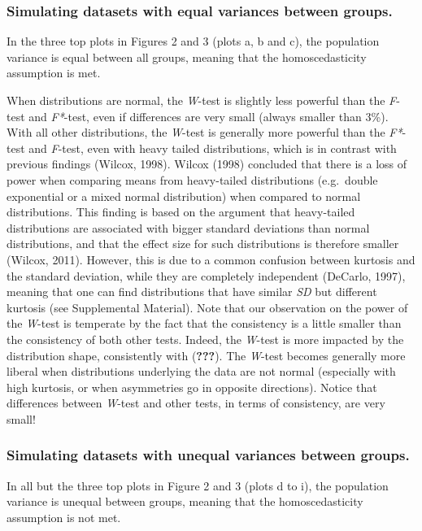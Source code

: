 \documentclass[man,floatsintext]{apa6}
\begin{document}
\subsubsection{Simulating datasets with equal variances between
groups.}\label{simulating-datasets-with-equal-variances-between-groups.}

In the three top plots in Figures 2 and 3 (plots a, b and c), the
population variance is equal between all groups, meaning that the
homoscedasticity assumption is met.

When distributions are normal, the \emph{W}-test is slightly less
powerful than the \emph{F}-test and \emph{F*}-test, even if differences
are very small (always smaller than 3\%). With all other distributions,
the \emph{W}-test is generally more powerful than the \emph{F*}-test and
\emph{F}-test, even with heavy tailed distributions, which is in
contrast with previous findings (Wilcox, 1998). Wilcox (1998) concluded
that there is a loss of power when comparing means from heavy-tailed
distributions (e.g.~double exponential or a mixed normal distribution)
when compared to normal distributions. This finding is based on the
argument that heavy-tailed distributions are associated with bigger
standard deviations than normal distributions, and that the effect size
for such distributions is therefore smaller (Wilcox, 2011). However,
this is due to a common confusion between kurtosis and the standard
deviation, while they are completely independent (DeCarlo, 1997),
meaning that one can find distributions that have similar \emph{SD} but
different kurtosis (see Supplemental Material). Note that our
observation on the power of the \emph{W}-test is temperate by the fact
that the consistency is a little smaller than the consistency of both
other tests. Indeed, the \emph{W}-test is more impacted by the
distribution shape, consistently with ({\textbf{???}}). The
\emph{W}-test becomes generally more liberal when distributions
underlying the data are not normal (especially with high kurtosis, or
when asymmetries go in opposite directions). Notice that differences
between \emph{W}-test and other tests, in terms of consistency, are very
small!

\subsubsection{Simulating datasets with unequal variances between
groups.}\label{simulating-datasets-with-unequal-variances-between-groups.-1}

In all but the three top plots in Figure 2 and 3 (plots d to i), the
population variance is unequal between groups, meaning that the
homoscedasticity assumption is not met.
\end{document}
